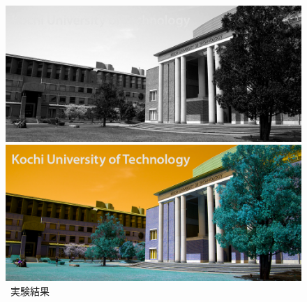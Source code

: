 \begin{figure}[H]
\begin{minipage}[b]{.19\textwidth}
    \end{minipage}
    \begin{minipage}[b]{.19\textwidth}
        \centering
        \includegraphics[keepaspectratio,width=\textwidth]{../../Figures/05_13_b.png}
    \end{minipage}
    \begin{minipage}[b]{.19\textwidth}
        \centering
        \includegraphics[keepaspectratio,width=\textwidth]{../../Figures/05_14_change.png}
    \end{minipage}
    \caption{\kadaiaa\ 実験結果}
\end{figure}
\newpage
